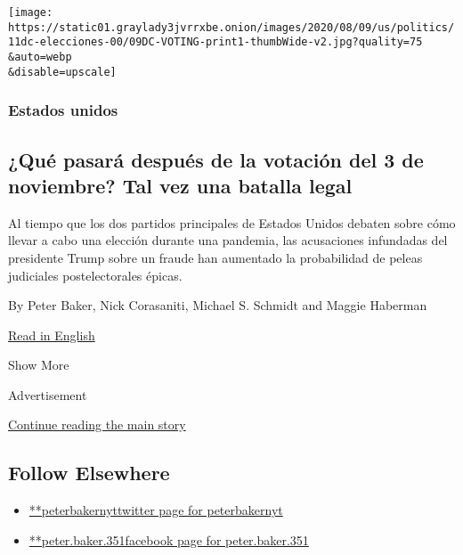 \begin{enumerate}
  \texttt{[image: https://static01.graylady3jvrrxbe.onion/images/2020/08/09/us/politics/11dc-elecciones-00/09DC-VOTING-print1-thumbWide-v2.jpg?quality=75\\\&auto=webp\\\&disable=upscale]}

  \hypertarget{estados-unidos}{%
  \subsubsection{Estados unidos}\label{estados-unidos}}

  \hypertarget{quuxe9-pasaruxe1-despuuxe9s-de-la-votaciuxf3n-del-3-de-noviembre-tal-vez-una-batalla-legal}{%
  \subsection{¿Qué pasará después de la votación del 3 de noviembre? Tal
  vez una batalla
  legal}\label{quuxe9-pasaruxe1-despuuxe9s-de-la-votaciuxf3n-del-3-de-noviembre-tal-vez-una-batalla-legal}}

  Al tiempo que los dos partidos principales de Estados Unidos debaten
  sobre cómo llevar a cabo una elección durante una pandemia, las
  acusaciones infundadas del presidente Trump sobre un fraude han
  aumentado la probabilidad de peleas judiciales postelectorales épicas.

  By Peter Baker, Nick Corasaniti, Michael S. Schmidt and Maggie
  Haberman

  \href{https://www.nytimes3xbfgragh.onion/2020/08/08/us/politics/voting-nov-3-election.html}{Read
  in English}
\end{enumerate}

Show More

Advertisement

\protect\hyperlink{after-mid2}{Continue reading the main story}

\hypertarget{follow-elsewhere}{%
\subsection{Follow Elsewhere}\label{follow-elsewhere}}

\begin{itemize}
\tightlist
\item
  \href{https://twitter.com/peterbakernyt}{**peterbakernyttwitter page
  for peterbakernyt}
\item
  \href{https://www.facebookcorewwwi.onion/peter.baker.351}{**peter.baker.351facebook
  page for peter.baker.351}
\end{itemize}

